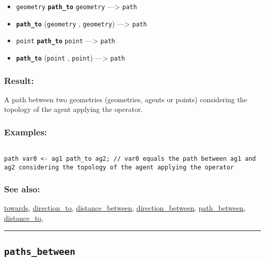 \documentclass[]{book}
\providecommand{\tightlist}{%
  \setlength{\itemsep}{0pt}\setlength{\parskip}{0pt}}
\theoremstyle{definition}
\theoremstyle{definition}
\theoremstyle{definition}
\theoremstyle{remark}
\begin{document}
\begin{itemize}
\tightlist
\item
  \texttt{geometry} \textbf{\texttt{path\_to}} \texttt{geometry}
  ---\textgreater{} \texttt{path}
\item
  \textbf{\texttt{path\_to}} (\texttt{geometry} , \texttt{geometry})
  ---\textgreater{} \texttt{path}
\item
  \texttt{point} \textbf{\texttt{path\_to}} \texttt{point}
  ---\textgreater{} \texttt{path}
\item
  \textbf{\texttt{path\_to}} (\texttt{point} , \texttt{point})
  ---\textgreater{} \texttt{path}
\end{itemize}

\subsubsection{Result:}\label{result-382}

A path between two geometries (geometries, agents or points) considering
the topology of the agent applying the operator.

\subsubsection{Examples:}\label{examples-272}

\begin{verbatim}
 
path var0 <- ag1 path_to ag2; // var0 equals the path between ag1 and ag2 considering the topology of the agent applying the operator
\end{verbatim}

\subsubsection{See also:}\label{see-also-160}

\href{OperatorsSZ\#towards}{towards},
\href{OperatorsDH\#direction_to}{direction\_to},
\href{OperatorsDH\#distance_between}{distance\_between},
\href{OperatorsDH\#direction_between}{direction\_between},
\href{OperatorsNR\#path_between}{path\_between},
\href{OperatorsDH\#distance_to}{distance\_to},

\begin{center}\rule{0.5\linewidth}{\linethickness}\end{center}

\subsection{\texorpdfstring{\texttt{paths\_between}}{paths\_between}}\label{paths_between}
\end{document}
